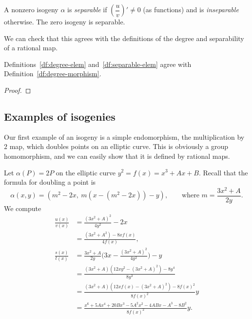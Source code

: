 \begin{df}\label{df:separable-elem}
A nonzero isogeny $\alpha$ is \emph{separable} if $\left(\dfrac{u}{v}\right)'\ne 0$ (as functions) and is \emph{inseparable} otherwise.
The zero isogeny is separable.
\end{df}

We can check that this agrees with the definitions of the degree and separability of a rational map.
\begin{pr}
Definitions~\ref{df:degree-elem} and~\ref{df:separable-elem} agree with Definition~\ref{df:degree-morphism}.
\end{pr}
\begin{proof}
\end{proof}


\subsection{Examples of isogenies}

Our first example of an isogeny is a simple endomorphism, the multiplication by $2$ map, which doubles points on an elliptic curve.
This is obviously a group homomorphism, and we can easily show that it is defined by rational maps.

\begin{ex}[Doubling]\label{ex:mult-2}
Let $\alpha(P) = 2P$ on the elliptic curve $y^2 = f(x) = x^3+Ax+B$.
Recall that the formula for doubling a point is \[\alpha(x,y) = (m^2-2x, \ m(x-(m^2-2x))-y),\qquad \text{where }m = \frac{3x^2+A}{2y}.\]
We compute
\begin{align*}
\frac{u(x)}{v(x)} &= \frac{(3x^2+A)^2}{4y^2} - 2x\\
&= \frac{(3x^2+A^2)-8xf(x)}{4f(x)},\\
\frac{s(x)}{t(x)} &= \frac{3x^2+A}{2y}\Bigg( 3x-\frac{(3x^2+A)^2}{4y^2}\Bigg)-y\\
&= \frac{(3x^2+A)(12xy^2-(3x^2+A)^2)-8y^4}{8y^3}\\
&= \frac{(3x^2+A)(12xf(x)-(3x^2+A)^2)-8f(x)^2}{8f(x)^2}y\\
&= \frac{x^6+5Ax^4+20Bx^3-5A^2x^2-4ABx-A^3-8B^2}{8f(x)^2}y.
\end{align*}
\end{ex}

